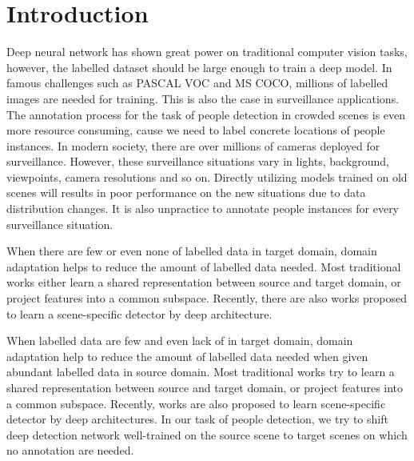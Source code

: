 \documentclass[runningheads]{llncs}
\begin{document}
\section{Introduction}

Deep neural network has shown great power on traditional computer vision tasks, however, the labelled dataset should be large enough to train a deep model. In famous challenges such as PASCAL VOC and MS COCO, millions of labelled images are needed for training. This is also the case in surveillance applications. The annotation process for the task of people detection in crowded scenes is even more resource consuming, cause we need to label concrete locations of people instances. In modern society, there are over millions of cameras deployed for surveillance. However, these surveillance situations vary in lights, background, viewpoints, camera resolutions and so on. Directly utilizing models trained on old scenes will results in poor performance on the new situations due to data distribution changes. It is also unpractice to annotate people instances for every surveillance situation.

When there are few or even none of labelled data in target domain, domain adaptation helps to reduce the amount of labelled data needed. Most traditional works \cite{saenko2010adapting,kulis2011you,gopalan2011domain,huang2006correcting,gretton2009covariate} either learn a shared representation between source and target domain, or project features into a common subspace. Recently, there are also works \cite{wang2014scene,zeng2014deep,hattori2015learning} proposed to learn a scene-specific detector by deep architecture. 



When labelled data are few and even lack of in target domain, domain adaptation help to reduce the amount of labelled data needed when given abundant labelled data in source domain. Most traditional works \cite{saenko2010adapting,kulis2011you,gopalan2011domain,huang2006correcting,gretton2009covariate} try to learn a shared representation between source and target domain, or project features into a common subspace. Recently, works are also \cite{wang2014scene,zeng2014deep,hattori2015learning} proposed to learn scene-specific detector by deep architectures. In our task of people detection, we try to shift deep detection network well-trained on the source scene to target scenes on which no annotation are needed.
\end{document}
